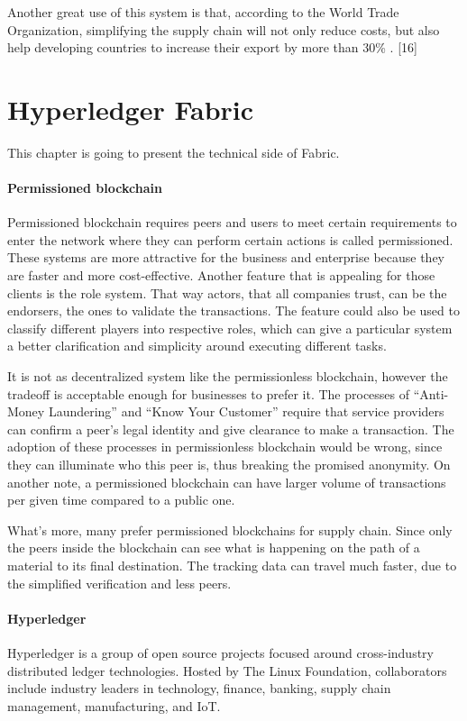 \documentclass[a4paper,11pt]{report}
\begin{document}
	Another great use of this system is that, according to the World Trade Organization, simplifying the supply chain will not only reduce costs, but also help developing countries to increase their export by more than 30\% . [16]

\chapter{Hyperledger Fabric}
\label{hplFabric}

This chapter is going to present the technical side of Fabric. 

\subsubsection{Permissioned blockchain}
Permissioned blockchain requires peers and users to meet certain requirements to enter the network where they can perform certain actions is called permissioned. These systems are more attractive for the business and enterprise because they are faster and more cost-effective. Another feature that is appealing for those clients is the role system. That way actors, that all companies trust, can be the endorsers, the ones to validate the transactions. The feature could also be used to classify different players into respective roles, which can give a particular system a better clarification and simplicity around executing different tasks. 

	It is not as decentralized system like the permissionless blockchain, however the tradeoff is acceptable enough for businesses to prefer it. The processes of “Anti-Money Laundering” and “Know Your Customer” require that service providers can confirm a peer’s legal identity and give clearance to make a transaction. The adoption of these processes in permissionless blockchain would be wrong, since they can illuminate who this peer is, thus breaking the promised anonymity. On another note, a permissioned blockchain can have larger volume of transactions per given time compared to a public one. 
	
What's more, many prefer permissioned blockchains for supply chain. Since only the peers inside the blockchain can see what is happening on the path of a material to its final destination. The tracking data can travel much faster, due to the simplified verification and less peers. 

\subsubsection{Hyperledger}
Hyperledger is a group of open source projects focused around cross-industry distributed ledger technologies. Hosted by The Linux Foundation, collaborators include industry leaders in technology, finance, banking, supply chain management, manufacturing, and IoT.
\end{document}
